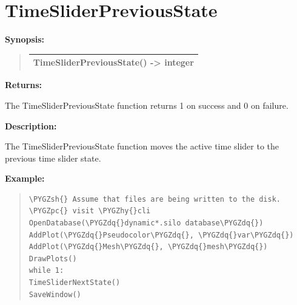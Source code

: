 \documentclass[letterpaper,10pt,english]{sphinxmanual}
\def\PYGZsh{\char`\#}
\def\PYGZpc{\char`\%}
\def\PYGZhy{\char`\-}
\def\PYGZdq{\char`\"}
\begin{document}
\section{TimeSliderPreviousState}
\label{functions:timesliderpreviousstate}
\begin{DUlineblock}{0em}
\item[] \textbf{Synopsis:}
\end{DUlineblock}
\begin{quote}

\begin{tabulary}{\linewidth}{|L|}
\hline

TimeSliderPreviousState() -\textgreater{} integer
\\
\hline\end{tabulary}

\end{quote}

\begin{DUlineblock}{0em}
\item[] 
\item[] \textbf{Returns:}
\item[] The TimeSliderPreviousState function returns 1 on success and 0 on failure.
\item[] 
\item[] \textbf{Description:}
\item[] The TimeSliderPreviousState function moves the active time slider to the
previous time slider state.
\end{DUlineblock}

\begin{DUlineblock}{0em}
\item[] 
\end{DUlineblock}

\begin{DUlineblock}{0em}
\item[] \textbf{Example:}
\item[] 
\end{DUlineblock}
\begin{quote}

\begin{Verbatim}[commandchars=\\\{\}]
\PYGZsh{} Assume that files are being written to the disk.
\PYGZpc{} visit \PYGZhy{}cli
OpenDatabase(\PYGZdq{}dynamic*.silo database\PYGZdq{})
AddPlot(\PYGZdq{}Pseudocolor\PYGZdq{}, \PYGZdq{}var\PYGZdq{})
AddPlot(\PYGZdq{}Mesh\PYGZdq{}, \PYGZdq{}mesh\PYGZdq{})
DrawPlots()
while 1:
TimeSliderNextState()
SaveWindow()
\end{Verbatim}
\end{quote}
\end{document}
